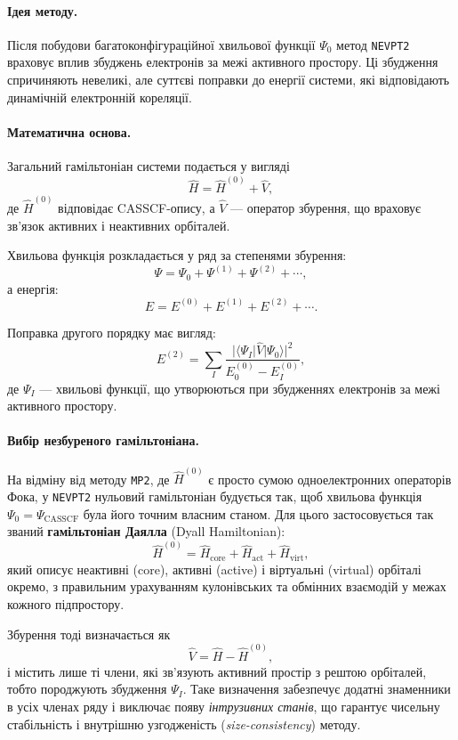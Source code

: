 \paragraph{Ідея методу.}
Після побудови багатоконфігураційної хвильової функції \(\Psi_0\)
метод \texttt{NEVPT2} враховує вплив збуджень електронів за межі активного простору.
Ці збудження спричиняють невеликі, але суттєві поправки до енергії системи,
які відповідають динамічній електронній кореляції.

\paragraph{Математична основа.}
Загальний гамільтоніан системи подається у вигляді
\[
\hat{H} = \hat{H}^{(0)} + \hat{V},
\]
де \(\hat{H}^{(0)}\) відповідає CASSCF-опису,
а \(\hat{V}\) --- оператор збурення, що враховує зв’язок активних
і неактивних орбіталей.

Хвильова функція розкладається у ряд за степенями збурення:
\[
\Psi = \Psi_0 + \Psi^{(1)} + \Psi^{(2)} + \cdots,
\]
а енергія:
\[
E = E^{(0)} + E^{(1)} + E^{(2)} + \cdots.
\]

Поправка другого порядку має вигляд:
\[
E^{(2)} = \sum_I
\frac{|\langle \Psi_I | \hat{V} | \Psi_0 \rangle|^2}
{E_0^{(0)} - E_I^{(0)}},
\]
де \(\Psi_I\) --- хвильові функції, що утворюються при збудженнях
електронів за межі активного простору.

\paragraph{Вибір незбуреного гамільтоніана.}
На відміну від методу \texttt{MP2}, де \(\hat{H}^{(0)}\) є просто сумою
одноелектронних операторів Фока, у \texttt{NEVPT2}
нульовий гамільтоніан будується так, щоб хвильова функція
\(\Psi_0 = \Psi_{\text{CASSCF}}\) була його точним власним станом.
Для цього застосовується так званий \textbf{гамільтоніан Даялла} (Dyall Hamiltonian):
\[
\hat{H}^{(0)} = \hat{H}_{\text{core}} + \hat{H}_{\text{act}} + \hat{H}_{\text{virt}},
\]
який описує неактивні (core), активні (active) і віртуальні (virtual) орбіталі
окремо, з правильним урахуванням кулонівських та обмінних взаємодій
у межах кожного підпростору.

Збурення тоді визначається як
\[
\boxed{
\hat{V} = \hat{H} - \hat{H}^{(0)},
}
\]
і містить лише ті члени, які зв’язують активний простір з рештою орбіталей,
тобто породжують збудження \(\Psi_I\).
Таке визначення забезпечує додатні знаменники в усіх членах
ряду і виключає появу \emph{інтрузивних станів}, що гарантує
чисельну стабільність і внутрішню узгодженість (\emph{size-consistency})
методу.

